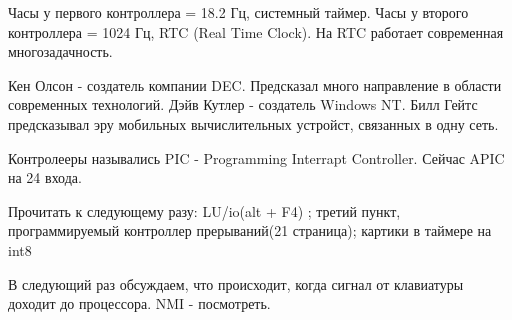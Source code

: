 Часы у первого контроллера = 18.2 Гц, системный таймер. Часы у второго контроллера = 1024 Гц, RTC (Real Time Clock). На RTC работает современная многозадачность. 

\begin{rem}
Кен Олсон - создатель компании DEC. Предсказал много направление в области современных технологий. Дэйв Кутлер - создатель Windows NT. Билл Гейтс предсказывал эру мобильных вычислительных устройст, связанных в одну сеть.\end{rem}

Контролееры назывались PIC - Programming Interrapt Controller. Сейчас APIC на 24 входа.

\begin{hw}Прочитать к следующему разу: LU/io(alt + F4) ; третий пункт, программируемый контроллер прерываний(21 страница); картики в таймере на int8\end{hw}

В следующий раз обсуждаем, что происходит, когда сигнал от клавиатуры доходит до процессора. NMI - посмотреть.
